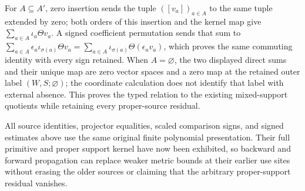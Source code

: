 For \(A\subseteq A'\), zero insertion sends the
tuple \(([v_a])_{a\in A}\) to the same tuple
extended by zero; both orders of this insertion
and the kernel map give
\(\sum_{a\in A}\iota_a\Theta v_a\).
A signed coefficient permutation sends that sum
to \(\sum_{a\in A}\epsilon_a
\iota_{\sigma(a)}\Theta v_a
=\sum_{a\in A}\iota_{\sigma(a)}
\Theta(\epsilon_a v_a)\), which proves the
same commuting identity with every sign retained.
When \(A=\varnothing\), the two displayed direct
sums and their unique map are zero vector spaces
and a zero map at the retained outer label
\((W,S;\varnothing)\); the coordinate calculation
does not identify that label with external
absence.  This proves
the typed relation to the existing mixed-support
quotients while retaining every proper-source
residual.

All source identities, projector equalities,
scaled comparison signs, and signed estimates
above use the same original finite polynomial
presentation.  Their full primitive and proper
support kernel have now been exhibited, so
backward and forward propagation can replace
weaker metric bounds at their earlier use sites
without erasing the older sources or claiming
that the arbitrary proper-support residual
vanishes.
